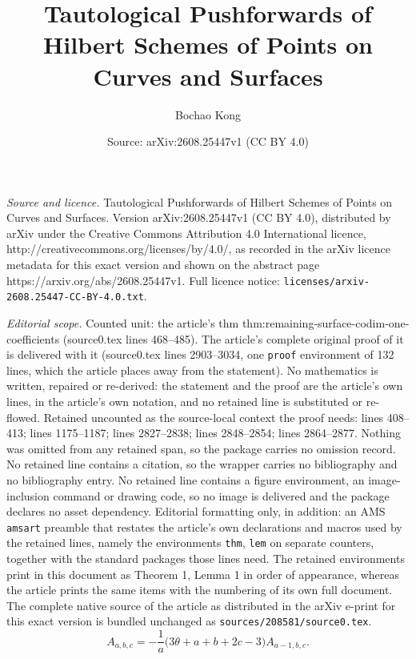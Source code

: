 \documentclass[10pt,a4paper]{amsart}
\title{Tautological Pushforwards of Hilbert Schemes of Points on Curves and Surfaces}
\author{Bochao Kong}
\date{Source: arXiv:2608.25447v1 (CC BY 4.0)}
\begin{document}
\maketitle

\noindent\emph{Source and licence.} Tautological Pushforwards of Hilbert Schemes of Points on Curves and Surfaces. Version arXiv:2608.25447v1 (CC BY 4.0), distributed by arXiv under the Creative Commons Attribution 4.0 International licence, http://creativecommons.org/licenses/by/4.0/, as recorded in the arXiv licence metadata for this exact version and shown on the abstract page https://arxiv.org/abs/2608.25447v1. Full licence notice: \texttt{licenses/arxiv-2608.25447-CC-BY-4.0.txt}.\par\smallskip

\noindent\textit{Editorial scope.} Counted unit: the article's thm thm:remaining-surface-codim-one-coefficients (source0.tex lines 468--485). The article's complete original proof of it is delivered with it (source0.tex lines 2903--3034, one \texttt{proof} environment of 132 lines, which the article places away from the statement). No mathematics is written, repaired or re-derived: the statement and the proof are the article's own lines, in the article's own notation, and no retained line is substituted or re-flowed.  Retained uncounted as the source-local context the proof needs: lines 408--413; lines 1175--1187; lines 2827--2838; lines 2848--2854; lines 2864--2877.  Nothing was omitted from any retained span, so the package carries no omission record.  No retained line contains a citation, so the wrapper carries no bibliography and no bibliography entry.  No retained line contains a figure environment, an image-inclusion command or drawing code, so no image is delivered and the package declares no asset dependency.  Editorial formatting only, in addition: an AMS \texttt{amsart} preamble that restates the article's own declarations and macros used by the retained lines, namely the environments \texttt{thm}, \texttt{lem} on separate counters, together with the standard packages those lines need.  The retained environments print in this document as Theorem 1, Lemma 1 in order of appearance, whereas the article prints the same items with the numbering of its own full document.  The complete native source of the article as distributed in the arXiv e-print for this exact version is bundled unchanged as \texttt{sources/208581/source0.tex}.
  \begin{equation}\label{surface-horizontal-recursion}
    A_{a,b,c}
    =
    -\frac1a
    \bigl(3\theta+a+b+2c-3\bigr)A_{a-1,b,c}.
  \end{equation}
\end{document}

